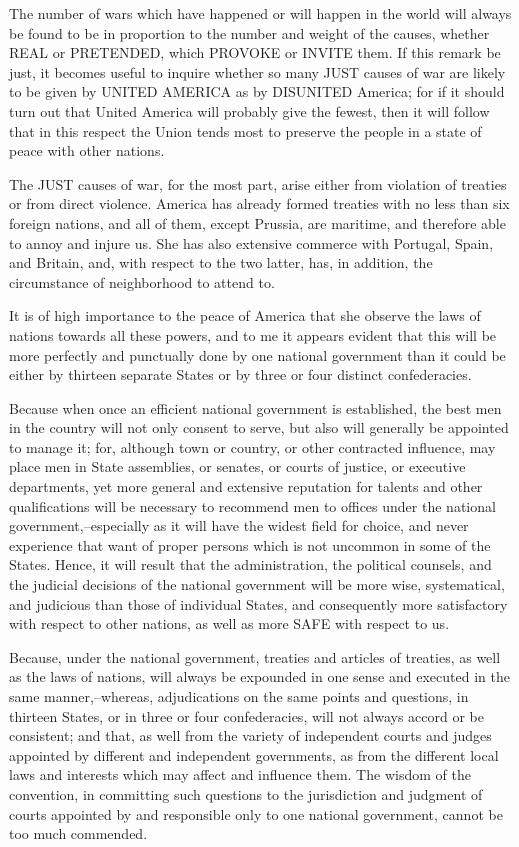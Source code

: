 The number of wars which have happened or will happen in the
world will always be found to be in proportion to the number and
weight of the causes, whether REAL or PRETENDED, which PROVOKE or
INVITE them. If this remark be just, it becomes useful to inquire
whether so many JUST causes of war are likely to be given by UNITED
AMERICA as by DISUNITED America; for if it should turn out that
United America will probably give the fewest, then it will follow
that in this respect the Union tends most to preserve the people in
a state of peace with other nations.

The JUST causes of war, for the most part, arise either from
violation of treaties or from direct violence. America has already
formed treaties with no less than six foreign nations, and all of
them, except Prussia, are maritime, and therefore able to annoy and
injure us. She has also extensive commerce with Portugal, Spain,
and Britain, and, with respect to the two latter, has, in addition,
the circumstance of neighborhood to attend to.

It is of high importance to the peace of America that she
observe the laws of nations towards all these powers, and to me it
appears evident that this will be more perfectly and punctually done
by one national government than it could be either by thirteen
separate States or by three or four distinct confederacies.

Because when once an efficient national government is
established, the best men in the country will not only consent to
serve, but also will generally be appointed to manage it; for,
although town or country, or other contracted influence, may place
men in State assemblies, or senates, or courts of justice, or
executive departments, yet more general and extensive reputation for
talents and other qualifications will be necessary to recommend men
to offices under the national government,--especially as it will have
the widest field for choice, and never experience that want of
proper persons which is not uncommon in some of the States. Hence,
it will result that the administration, the political counsels, and
the judicial decisions of the national government will be more wise,
systematical, and judicious than those of individual States, and
consequently more satisfactory with respect to other nations, as
well as more SAFE with respect to us.

Because, under the national government, treaties and articles of
treaties, as well as the laws of nations, will always be expounded
in one sense and executed in the same manner,--whereas, adjudications
on the same points and questions, in thirteen States, or in three or
four confederacies, will not always accord or be consistent; and
that, as well from the variety of independent courts and judges
appointed by different and independent governments, as from the
different local laws and interests which may affect and influence
them. The wisdom of the convention, in committing such questions to
the jurisdiction and judgment of courts appointed by and responsible
only to one national government, cannot be too much commended.

